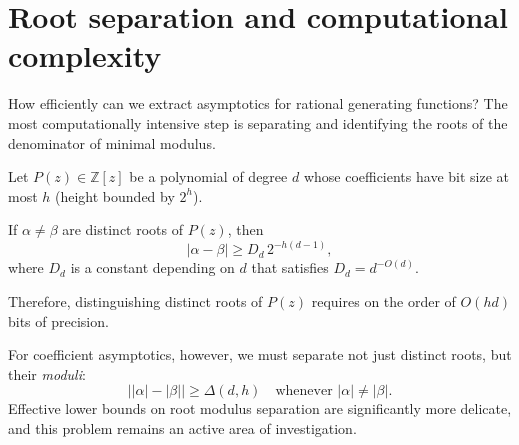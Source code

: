 \section*{Root separation and computational complexity}

How efficiently can we extract asymptotics for rational generating functions?
The most computationally intensive step is separating and identifying the roots of the denominator of minimal modulus.

Let \(P(z) \in \mathbb{Z}[z]\) be a polynomial of degree \(d\) whose coefficients have bit size at most \(h\) (height bounded by \(2^h\)).

\begin{lemma}
    \label{lem:root-separation}
    If \(\alpha \neq \beta\) are distinct roots of \(P(z)\), then
    \[
        |\alpha - \beta| \ge D_d \, 2^{-h(d-1)},
    \]
    where \(D_d\) is a constant depending on \(d\) that satisfies \(D_d = d^{-O(d)}\).
\end{lemma}

Therefore, distinguishing distinct roots of \(P(z)\) requires on the order of \(O(hd)\) bits of precision.

For coefficient asymptotics, however, we must separate not just distinct roots, but their \emph{moduli}:
\[
    \big| |\alpha| - |\beta| \big| \ge \Delta(d, h) \quad \text{whenever } |\alpha| \neq |\beta|.
\]
Effective lower bounds on root modulus separation are significantly more delicate, and this problem remains an active area of investigation.